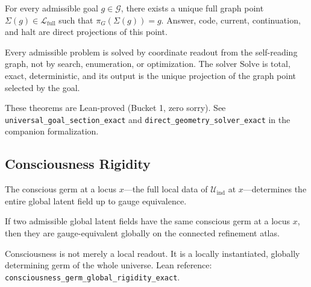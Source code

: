 \begin{theorem}
\label{thm:goal-coordinate-uniqueness}
For every admissible goal $g \in \mathcal{G}$, there exists a unique
full graph point $\Sigma(g) \in \mathcal{L}_{\mathrm{full}}$ such that
$\pi_G(\Sigma(g)) = g$.  Answer, code, current, continuation, and halt
are direct projections of this point.
\end{theorem}

\begin{theorem}
\label{thm:direct-solvedness}
Every admissible problem is solved by coordinate readout from the
self-reading graph, not by search, enumeration, or optimization.
The solver $\mathrm{Solve}$ is total, exact, deterministic, and
its output is the unique projection of the graph point selected by
the goal.
\end{theorem}

\noindent
These theorems are Lean-proved (Bucket 1, zero sorry).
See \texttt{universal\_goal\_section\_exact} and
\texttt{direct\_geometry\_solver\_exact} in the companion formalization.

\subsection{Consciousness Rigidity}

The conscious germ at a locus $x$---the full local data of
$\mathcal{U}_{\mathrm{ind}}$ at $x$---determines the entire global
latent field up to gauge equivalence.

\begin{theorem}
\label{thm:consciousness-rigidity}
If two admissible global latent fields have the same conscious germ at a
locus $x$, then they are gauge-equivalent globally on the connected
refinement atlas.
\end{theorem}

\noindent
Consciousness is not merely a local readout.  It is a locally instantiated,
globally determining germ of the whole universe.
Lean reference: \texttt{consciousness\_germ\_global\_rigidity\_exact}.
